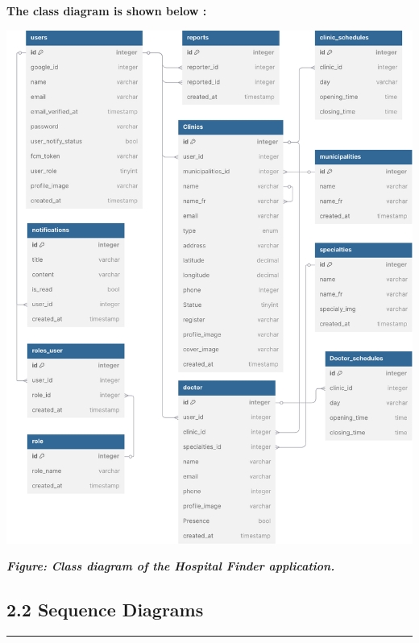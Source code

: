 \documentclass[12pt]{report}
\begin{document}
\vspace{4cm}
\begin{center}
	\textbf{ The class diagram is shown below : }
\end{center}
\begin{center}
	\hspace*{-1cm}\includegraphics[width=1.1\textwidth]{images/dbclass.pdf}
\end{center}
\vspace{0.5cm}
\begin{center}
	\textit{\textbf{Figure: Class diagram of the Hospital Finder application.}}

\end{center}
\vspace{0.5cm}
\subsection*{2.2 Sequence Diagrams}
\vspace{-0.3cm}
\rule{7.2cm}{1.2pt}
\vspace{-0.3cm}
\end{document}
